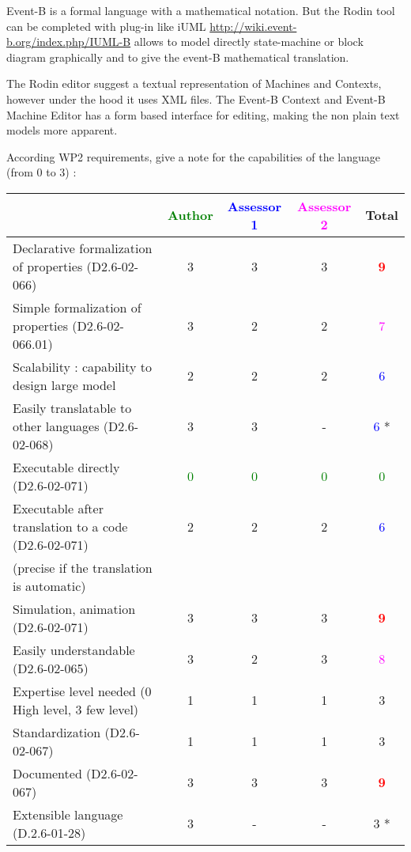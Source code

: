 \begin{author_comment}
Event-B  is a formal language with a mathematical notation. But the Rodin tool can be completed with plug-in like iUML \url{http://wiki.event-b.org/index.php/IUML-B} allows to model directly state-machine or block diagram  graphically and to  give the event-B mathematical translation.
\end{author_comment}

\begin{assessor2}
  The Rodin editor suggest a textual representation of Machines and
  Contexts, however under the hood it uses XML files. The Event-B
  Context and Event-B Machine Editor has a form based interface for
  editing, making the non plain text models more apparent.
\end{assessor2}

According WP2 requirements, give a note for the capabilities of the language (from 0 to 3) :

\begin{tabular}{|l | c | c | c | c|}
\hline
& \textcolor{green}{Author} & \textcolor{blue}{Assessor 1} & \textcolor{magenta}{Assessor 2} & Total \\
\hline
Declarative formalization of properties (D2.6-02-066) & 3     & 3     & 3     & \textcolor{red}{\textbf{9}} \\
\hline
Simple formalization of properties (D2.6-02-066.01) & 3     & 2     & 2     & \textcolor{magenta}{7} \\
\hline
Scalability : capability to design large model & 2     & 2     & 2     & \textcolor{blue}{6} \\
\hline
Easily translatable to other languages (D2.6-02-068) & 3     & 3     & - & \textcolor{blue}{6} * \\
\hline
Executable directly (D2.6-02-071) & \textcolor{green}{0} & \textcolor{green}{0} & \textcolor{green}{0} & \textcolor{green}{0} \\
\hline
Executable after translation to a code (D2.6-02-071) & 2     & 2     & 2     & \textcolor{blue}{6} \\
(precise if the translation is automatic) & & & & \\
\hline
Simulation, animation (D2.6-02-071) & 3     & 3     & 3     & \textcolor{red}{\textbf{9}} \\
\hline
Easily understandable (D2.6-02-065) & 3     & 2     & 3     & \textcolor{magenta}{8} \\
\hline
Expertise level needed (0 High level, 3 few level) & 1     & 1     & 1     & 3     \\
\hline
Standardization (D2.6-02-067) & 1     & 1     & 1     & 3    \\
\hline
Documented (D2.6-02-067) & 3     & 3     & 3     & \textcolor{red}{\textbf{9}} \\
\hline
Extensible language (D.2.6-01-28) & 3     & - & - & 3    * \\
\hline
\end{tabular}

